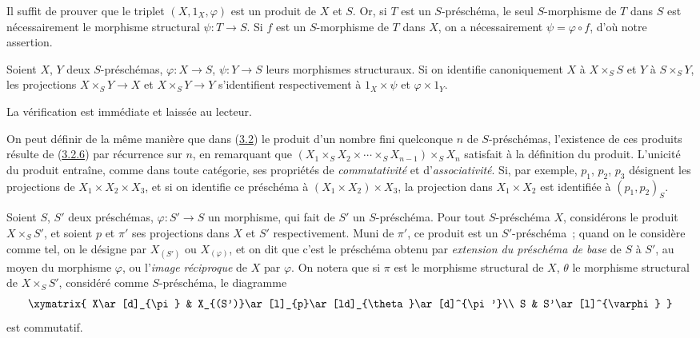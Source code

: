 Il suffit de prouver que le triplet $(X,1_X,\varphi)$ est un produit de $X$
et $S$. Or, si $T$ est un $S$-préschéma, le seul $S$-morphisme de $T$ dans
$S$ est nécessairement le morphisme structural $\psi:T\to S$. Si $f$ est
un $S$-morphisme de $T$ dans $X$, on a nécessairement
$\psi=\varphi\circ f$, d'où notre assertion.

\begin{corollary}[3.3.4]
\label{I.3.3.4-fr}
Soient $X$, $Y$ deux $S$-préschémas, $\varphi:X\to S$, $\psi:Y\to S$ leurs
morphismes structuraux. Si on identifie canoniquement $X$ à $X\times_S S$
et $Y$ à $S\times_S Y$, les projections $X\times_S Y\to X$ et
$X\times_S Y\to Y$ s'identifient respectivement à $1_X\times\psi$ et
$\varphi\times 1_Y$.
\end{corollary}

La vérification est immédiate et laissée au lecteur.

\begin{env}[3.3.5]
\label{I.3.3.5-fr}
On peut définir de la même manière que dans
(\hyperref[subsection:I.3.2-fr]{3.2}) le produit d'un
nombre fini quelconque $n$ de $S$-préschémas, l'existence de ces produits
résulte de (\hyperref[I.3.2.6-fr]{3.2.6}) par récurrence sur $n$, en remarquant
que
$(X_1\times_S X_2\times\cdots\times_S X_{n-1})\times_S X_n$ satisfait à
la définition du produit. L'unicité du produit entraîne, comme dans toute
catégorie, ses propriétés de \emph{commutativité} et d'\emph{associativité}.
Si, par exemple, $p_1$, $p_2$, $p_3$ désignent les projections de
$X_1\times X_2\times X_3$, et si on identifie ce préschéma à
$(X_1\times X_2)\times X_3$, la projection dans $X_1\times X_2$ est
identifiée à $(p_1,p_2)_S$.
\end{env}

\begin{env}[3.3.6]
\label{I.3.3.6-fr}
Soient $S$, $S'$ deux préschémas, $\varphi:S'\to S$ un morphisme, qui fait de
$S'$ un $S$-préschéma. Pour tout $S$-préschéma $X$, considérons le produit
$X\times_S S'$, et soient $p$ et $\pi'$ ses projections dans $X$ et $S'$
respectivement. Muni de $\pi'$, ce produit est un $S'$-préschéma~; quand on le
considère comme tel, on le désigne par $X_{(S')}$ ou $X_{(\varphi)}$, et on dit
que c'est le préschéma obtenu par \emph{extension du préschéma de base} de $S$
à $S'$, au moyen du morphisme $\varphi$, ou l'\emph{image réciproque} de $X$
par $\varphi$. On notera que si $\pi$ est le morphisme structural de $X$,
$\theta$ le morphisme structural de $X\times_S S'$, considéré comme
$S$-préschéma, le diagramme
\label{I.3.3.6.base-change-diagram-fr}
\[
  \xymatrix{
    X\ar[d]_{\pi} &
    X_{(S')}\ar[l]_{p}\ar[ld]_{\theta}\ar[d]^{\pi'}\\
    S & S'\ar[l]^{\varphi}
  }
\]
est commutatif.
\end{env}

